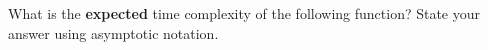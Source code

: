\begin{prob}
    What is the \textbf{expected} time complexity of the following function?
    State your answer using asymptotic notation.

    \inputminted[lastline=11]{python}{\thisdir/code.py}


\end{prob}
